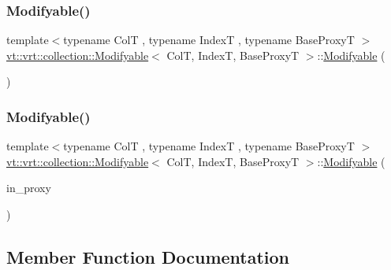 \subsubsection{\texorpdfstring{Modifyable()}{Modifyable()}\hspace{0.1cm}{\footnotesize\ttfamily [3/4]}}
{\footnotesize\ttfamily template$<$typename ColT , typename IndexT , typename Base\+ProxyT $>$ \\
\hyperlink{structvt_1_1vrt_1_1collection_1_1_modifyable}{vt\+::vrt\+::collection\+::\+Modifyable}$<$ ColT, IndexT, Base\+ProxyT $>$\+::\hyperlink{structvt_1_1vrt_1_1collection_1_1_modifyable}{Modifyable} (\begin{DoxyParamCaption}\item[{\hyperlink{structvt_1_1vrt_1_1collection_1_1_modifyable}{Modifyable}$<$ ColT, IndexT, Base\+ProxyT $>$ \&\&}]{ }\end{DoxyParamCaption})\hspace{0.3cm}{\ttfamily [default]}}

\mbox{\label{structvt_1_1vrt_1_1collection_1_1_modifyable_a3f1095fd21f68663a410c6a01e7f7e1b}} 
\subsubsection{\texorpdfstring{Modifyable()}{Modifyable()}\hspace{0.1cm}{\footnotesize\ttfamily [4/4]}}
{\footnotesize\ttfamily template$<$typename ColT , typename IndexT , typename Base\+ProxyT $>$ \\
\hyperlink{structvt_1_1vrt_1_1collection_1_1_modifyable}{vt\+::vrt\+::collection\+::\+Modifyable}$<$ ColT, IndexT, Base\+ProxyT $>$\+::\hyperlink{structvt_1_1vrt_1_1collection_1_1_modifyable}{Modifyable} (\begin{DoxyParamCaption}\item[{\hyperlink{namespacevt_a1b417dd5d684f045bb58a0ede70045ac}{Virtual\+Proxy\+Type} const}]{in\+\_\+proxy }\end{DoxyParamCaption})\hspace{0.3cm}{\ttfamily [explicit]}}



\subsection{Member Function Documentation}
\mbox{\label{structvt_1_1vrt_1_1collection_1_1_modifyable_a29d7b74d412571f4c5d413232a1788cd}} 
